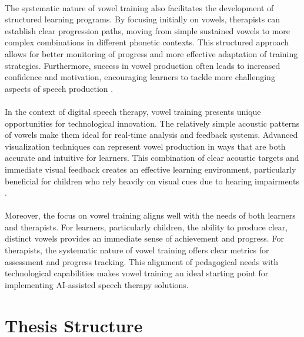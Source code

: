 \paragraph{}
The systematic nature of vowel training also facilitates the development of structured learning programs. By focusing initially on vowels, therapists can establish clear progression paths, moving from simple sustained vowels to more complex combinations in different phonetic contexts. This structured approach allows for better monitoring of progress and more effective adaptation of training strategies. Furthermore, success in vowel production often leads to increased confidence and motivation, encouraging learners to tackle more challenging aspects of speech production \cite{motivation_speech2023}.

\paragraph{}
In the context of digital speech therapy, vowel training presents unique opportunities for technological innovation. The relatively simple acoustic patterns of vowels make them ideal for real-time analysis and feedback systems. Advanced visualization techniques can represent vowel production in ways that are both accurate and intuitive for learners. This combination of clear acoustic targets and immediate visual feedback creates an effective learning environment, particularly beneficial for children who rely heavily on visual cues due to hearing impairments \cite{digital_therapy2022}.

\paragraph{}
Moreover, the focus on vowel training aligns well with the needs of both learners and therapists. For learners, particularly children, the ability to produce clear, distinct vowels provides an immediate sense of achievement and progress. For therapists, the systematic nature of vowel training offers clear metrics for assessment and progress tracking. This alignment of pedagogical needs with technological capabilities makes vowel training an ideal starting point for implementing AI-assisted speech therapy solutions.

\section{Thesis Structure}
\label{sec:structure}

